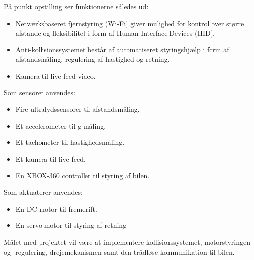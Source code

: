 På punkt opstilling ser funktionerne således ud:

\begin{itemize}\itemsep1pt \parskip0pt 
	\item Netværksbaseret fjernstyring (Wi-Fi) giver mulighed for kontrol over større afstande og fleksibilitet i form af Human Interface Devices (HID).
	\item Anti-kollisionssystemet består af automatiseret styringshjælp i form af
afstandsmåling, regulering af hastighed og retning.
	\item Kamera til live-feed video.
\end{itemize}

Som sensorer anvendes:

\begin{itemize}\itemsep1pt \parskip0pt 
	\item Fire ultralydssensorer til afstandsmåling.
	\item Et accelerometer til g-måling.
	\item Et tachometer til hastighedsmåling.
	\item Et kamera til live-feed.
	\item En XBOX-360 controller til styring af bilen.
\end{itemize}

Som aktuatorer anvendes:

\begin{itemize}\itemsep1pt \parskip0pt 
	\item En DC-motor til fremdrift.
	\item En servo-motor til styring af retning.
\end{itemize}

Målet med projektet vil være at implementere  kollisionssystemet, motorstyringen og -regulering, drejemekanismen samt den trådløse kommunikation til bilen.